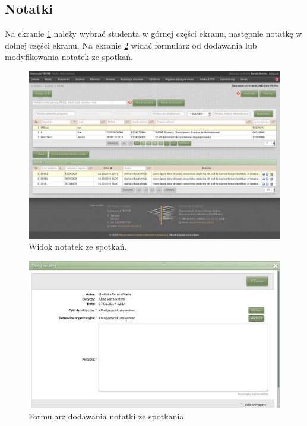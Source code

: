\documentclass[licencjacka]{pracamgr}
\begin{document}
\subsection{Notatki}
Na ekranie \ref{fig:notatki} należy wybrać studenta w górnej części ekranu, następnie notatkę w dolnej części ekranu.
Na ekranie \ref{fig:formularz_notatek} widać formularz od dodawania lub modyfikowania notatek ze spotkań.

\begin{figure}[!]
  \includegraphics[width=\linewidth]{widok_notatek.jpg}
  \caption{Widok notatek ze spotkań.}
  \label{fig:notatki}
\end{figure}

\begin{figure}[!]
  \includegraphics[width=\linewidth]{formularz_notatek.jpg}
  \caption{Formularz dodawania notatki ze spotkania.}
  \label{fig:formularz_notatek}
\end{figure}


\end{document}
